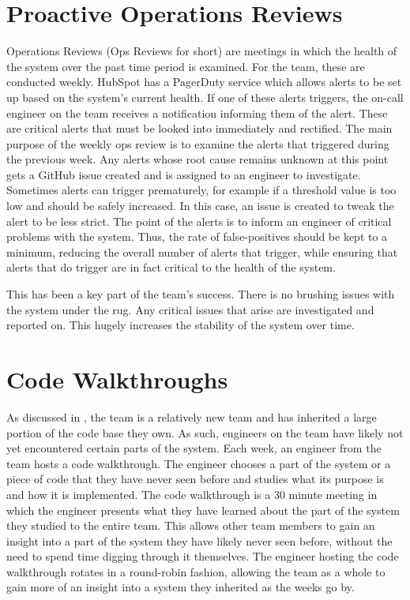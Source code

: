 \section{Proactive Operations Reviews}
Operations Reviews (Ops Reviews for short) are meetings in which the health of the system over the past time period is examined. For the \team{} team, these are conducted weekly. HubSpot has a PagerDuty service which allows alerts to be set up based on the system's current health. If one of these alerts triggers, the on-call engineer on the team receives a notification informing them of the alert. These are critical alerts that must be looked into immediately and rectified. The main purpose of the weekly ops review is to examine the alerts that triggered during the previous week. Any alerts whose root cause remains unknown at this point gets a GitHub issue created and is assigned to an engineer to investigate. Sometimes alerts can trigger prematurely, for example if a threshold value is too low and should be safely increased. In this case, an issue is created to tweak the alert to be less strict. The point of the alerts is to inform an engineer of critical problems with the system. Thus, the rate of false-positives should be kept to a minimum, reducing the overall number of alerts that trigger, while ensuring that alerts that do trigger are in fact critical to the health of the system.

This has been a key part of the \team{} team's success. There is no brushing issues with the system under the rug. Any critical issues that arise are investigated and reported on. This hugely increases the stability of the system over time. 

\section{Code Walkthroughs}
As discussed in , the \team{} team is a relatively new team and has inherited a large portion of the code base they own. As such, engineers on the team have likely not yet encountered certain parts of the system. Each week, an engineer from the team hosts a code walkthrough. The engineer chooses a part of the system or a piece of code that they have never seen before and studies what its purpose is and how it is implemented. The code walkthrough is a 30 minute meeting in which the engineer presents what they have learned about the part of the system they studied to the entire team. This allows other team members to gain an insight into a part of the system they have likely never seen before, without the need to spend time digging through it themselves. The engineer hosting the code walkthrough rotates in a round-robin fashion, allowing the team as a whole to gain more of an insight into a system they inherited as the weeks go by. 

